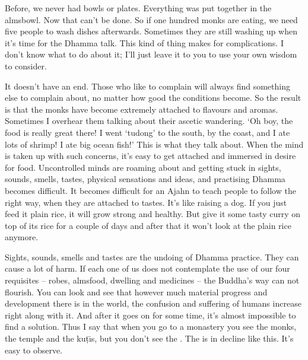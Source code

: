 Before, we never had bowls or plates. Everything was put together in the almsbowl. Now that can't be done. So if one hundred monks are eating, we need five people to wash dishes afterwards. Sometimes they are still washing up when it's time for the Dhamma talk. This kind of thing makes for complications. I don't know what to do about it; I'll just leave it to you to use your own wisdom to consider. 

It doesn't have an end. Those who like to complain will always find something else to complain about, no matter how good the conditions become. So the result is that the monks have become extremely attached to flavours and aromas. Sometimes I overhear them talking about their ascetic wandering. `Oh boy, the food is really great there! I went `tudong' to the south, by the coast, and I ate lots of shrimp! I ate big ocean fish!' This is what they talk about. When the mind is taken up with such concerns, it's easy to get attached and immersed in desire for food. Uncontrolled minds are roaming about and getting stuck in sights, sounds, smells, tastes, physical sensations and ideas, and practising Dhamma becomes difficult. It becomes difficult for an Ajahn to teach people to follow the right way, when they are attached to tastes. It's like raising a dog. If you just feed it plain rice, it will grow strong and healthy. But give it some tasty curry on top of its rice for a couple of days and after that it won't look at the plain rice anymore. 

Sights, sounds, smells and tastes are the undoing of Dhamma practice. They can cause a lot of harm. If each one of us does not contemplate the use of our four requisites -- robes, almsfood, dwelling and medicines -- the Buddha's way can not flourish. You can look and see that however much material progress and development there is in the world, the confusion and suffering of humans increase right along with it. And after it goes on for some time, it's almost impossible to find a solution. Thus I say that when you go to a monastery you see the monks, the temple and the ku\d{t}\={\i}s, but you don't see the . The  is in decline like this. It's easy to observe. 

